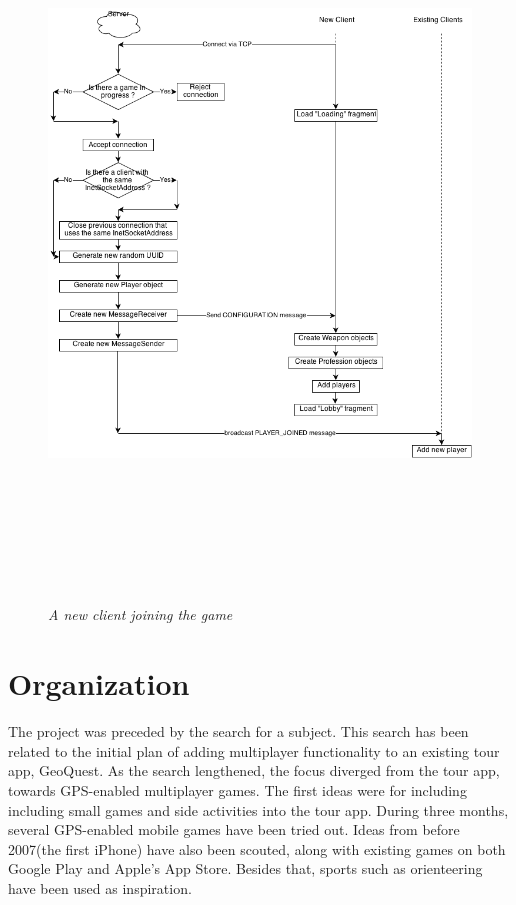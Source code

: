 \documentclass{article}
\begin{document}
\begin{figure}
\includegraphics[height=7.665in,width=6.23in]{./images/diagrams/Client-Server.png}
\caption{\small \sl A new client joining the game
\label{fig:client_server_flow}}
\end{figure}

\section{Organization}

The project was preceded by the search for a subject. This search has been
related to the initial plan of adding multiplayer functionality to an existing
tour app, GeoQuest. As the search lengthened, the focus diverged from the
tour app, towards GPS-enabled multiplayer games. The first ideas were for
including including small games and side activities into the tour app.
During three months, several GPS-enabled mobile games have been tried out.
Ideas from before 2007(the first iPhone) have also been scouted, along with
existing games on both Google Play and Apple's App Store. Besides that, sports
such as orienteering have been used as inspiration.\newline
\end{document}
